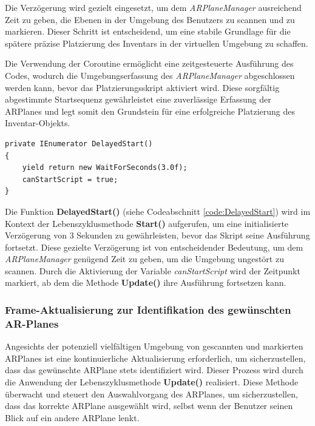 Die Verzögerung wird gezielt eingesetzt, um dem \textit{ARPlaneManager} ausreichend Zeit zu geben, die Ebenen in der
Umgebung des Benutzers zu scannen und zu markieren. Dieser Schritt ist entscheidend, um eine stabile Grundlage für die
spätere präzise Platzierung des Inventars in der virtuellen Umgebung zu schaffen.

Die Verwendung der Coroutine ermöglicht eine zeitgesteuerte Ausführung des Codes, wodurch die Umgebungserfassung des
\textit{ARPlaneManager} abgeschlossen werden kann, bevor das Platzierungsskript aktiviert wird. Diese sorgfältig abgestimmte
Startsequenz gewährleistet eine zuverlässige Erfassung der ARPlanes und legt somit den Grundstein für eine erfolgreiche
Platzierung des Inventar-Objekts.

\begin{lstlisting}[style=csharp, caption={Verzoegerter Start}, label=code:DelayedStart]
private IEnumerator DelayedStart()
{
    yield return new WaitForSeconds(3.0f);
    canStartScript = true;
}
\end{lstlisting}
Die Funktion \textbf{DelayedStart()} (siehe Codeabschnitt \ref{code:DelayedStart}) wird im Kontext der Lebenszyklusmethode
\textbf{Start()} aufgerufen, um eine initialisierte Verzögerung von 3 Sekunden zu gewährleisten, bevor das Skript seine
Ausführung fortsetzt. Diese gezielte Verzögerung ist von entscheidender Bedeutung, um dem \textit{ARPlaneManager} genügend
Zeit zu geben, um die Umgebung ungestört zu scannen. Durch die Aktivierung der Variable \textit{canStartScript} wird der
Zeitpunkt markiert, ab dem die Methode \textbf{Update()} ihre Ausführung fortsetzen kann.

\subsubsection{Frame-Aktualisierung zur Identifikation des gewünschten AR-Planes}
Angesichts der potenziell vielfältigen Umgebung von gescannten und markierten ARPlanes ist eine kontinuierliche Aktualisierung
erforderlich, um sicherzustellen, dass das gewünschte ARPlane stets identifiziert wird. Dieser Prozess wird durch die
Anwendung der Lebenszyklusmethode \textbf{Update()} realisiert. Diese Methode überwacht und steuert den Auswahlvorgang
des ARPlanes, um sicherzustellen, dass das korrekte ARPlane ausgewählt wird, selbst wenn der Benutzer seinen Blick auf
ein andere ARPlane lenkt.

